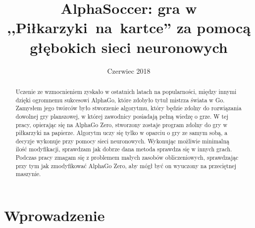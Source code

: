 \documentclass[licencjacka]{pracamgr}
\title{AlphaSoccer: gra w ,,Piłkarzyki~na~kartce'' za pomocą głębokich sieci neuronowych}
\date{Czerwiec 2018}
\begin{document}
\maketitle

\begin{abstract}

Uczenie ze wzmocnieniem zyskało w ostatnich latach na popularności, między innymi dzięki ogromnemu sukcesowi AlphaGo, które zdobyło tytuł mistrza świata w Go. Zamysłem jego twórców było stworzenie algorytmu, który będzie zdolny do rozwiązania dowolnej gry planszowej, w której zawodnicy posiadają pełną wiedzę o grze. 
W tej pracy, opierając się na AlphaGo Zero, stworzony zostaje program zdolny do gry w piłkarzyki na papierze. Algorytm uczy się tylko w oparciu o gry ze samym sobą, a decyzje wykonuje przy pomocy sieci neuronowych. Wykonując możliwie minimalną ilość modyfikacji, sprawdzam jak dobrze dana metoda sprawdza się w innych grach. Podczas pracy zmagam się z problemem małych zasobów obliczeniowych, sprawdzając przy tym jak zmodyfikować AlphaGo Zero, aby mógł być on wyuczony na przeciętnej maszynie.

\end{abstract}

\tableofcontents

\chapter{Wprowadzenie}\label{r:intro}


\end{document}
